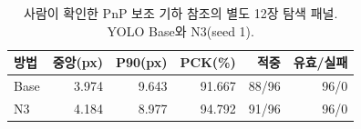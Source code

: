 \begin{table}[t]\centering\footnotesize
\caption{사람이 확인한 PnP 보조 기하 참조의 별도 12장 탐색 패널. YOLO Base와 N3(seed 1).}\label{tab:lifter_assisted_geometry}
\begin{tabularx}{\columnwidth}{Yrrrrr}\toprule
방법 & 중앙(px) & P90(px) & PCK(\%) & 적중 & 유효/실패 \\\midrule
Base & 3.974 & 9.643 & 91.667 & 88/96 & 96/0 \\
N3 & 4.184 & 8.977 & 94.792 & 91/96 & 96/0 \\
\bottomrule\end{tabularx}
\end{table}
